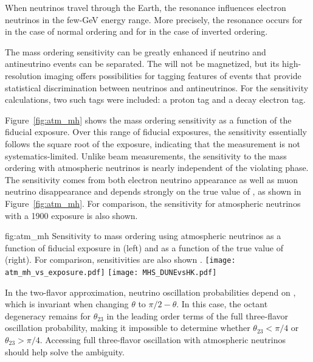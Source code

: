 When neutrinos travel through the Earth, the  resonance influences 
electron neutrinos in the few-\si{GeV} energy range. More precisely, the resonance 
occurs for \nue in the case of normal ordering and for \anue in the case of inverted ordering.

The mass ordering sensitivity can be greatly enhanced if neutrino and antineutrino events can be 
separated. The   will not be magnetized, but its high-resolution 
imaging offers possibilities for tagging features of events that provide statistical 
discrimination between neutrinos and antineutrinos. For the sensitivity calculations, 
two such tags were included: a proton tag and a decay electron tag. 

Figure~\ref{fig:atm_mh} shows the mass ordering sensitivity as a function of the fiducial exposure.  Over this range of fiducial exposures, the sensitivity essentially follows the square root of the exposure, indicating that the measurement is not systematics-limited. Unlike beam measurements, the sensitivity to the mass ordering with atmospheric neutrinos is nearly independent of the  violating phase.  The sensitivity comes from both electron neutrino appearance as well as muon neutrino disappearance and depends strongly on the true value of , as shown in Figure~\ref{fig:atm_mh}. For comparison, the sensitivity for \hyperk atmospheric neutrinos with a \SI{1900}{\ktyr} exposure is also shown.

\begin{dunefigure}
{fig:atm_mh}
{Sensitivity to mass ordering using atmospheric neutrinos as a function of fiducial exposure in  (left) and as a function of the true value of  (right).  For comparison, \hyperk sensitivities are also shown \cite{Abe:2018uyc}.}
\texttt{[image: atm\_mh\_vs\_exposure.pdf]}
\texttt{[image: MHS\_DUNEvsHK.pdf]}
\end{dunefigure}

In the two-flavor approximation, neutrino oscillation probabilities depend on 
\sinst, which is invariant when changing $\theta$ to $\pi/2-\theta$. In this case, the octant degeneracy remains for $\theta_{23}$ in the leading order terms of the full 
three-flavor oscillation probability, making it impossible to determine whether $\theta_{23}< \pi/4$ or 
$\theta_{23}> \pi/4$. Accessing full three-flavor oscillation with atmospheric neutrinos 
should help solve the ambiguity.


